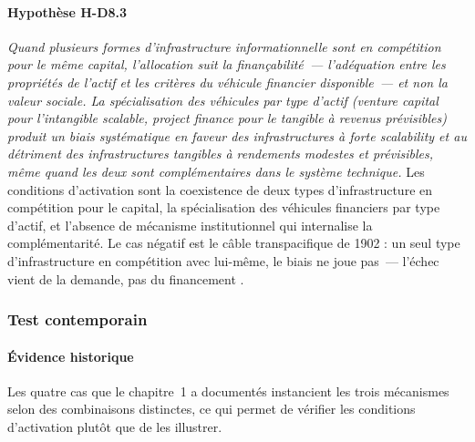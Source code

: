 \paragraph{Hypothèse H-D8.3} \emph{Quand plusieurs formes d'infrastructure informationnelle sont en compétition pour le même capital, l'allocation suit la \emph{finançabilité}~--- l'adéquation entre les propriétés de l'actif et les critères du véhicule financier disponible~--- et non la valeur sociale. La spécialisation des véhicules par type d'actif (\emph{venture capital} pour l'intangible scalable, \emph{project finance} pour le tangible à revenus prévisibles) produit un biais systématique en faveur des infrastructures à forte \emph{scalability} et au détriment des infrastructures tangibles à rendements modestes et prévisibles, même quand les deux sont complémentaires dans le système technique.} Les conditions d'activation sont la coexistence de deux types d'infrastructure en compétition pour le capital, la spécialisation des véhicules financiers par type d'actif, et l'absence de mécanisme institutionnel qui internalise la complémentarité. Le cas négatif est le câble transpacifique de 1902 : un seul type d'infrastructure en compétition avec lui-même, le biais ne joue pas~--- l'échec vient de la demande, pas du financement \parencite{muller_telegraph_2015}.


\subsubsection{Test contemporain}

\paragraph{Évidence historique}

Les quatre cas que le chapitre~1 a documentés instancient les trois mécanismes selon des combinaisons distinctes, ce qui permet de vérifier les conditions d'activation plutôt que de les illustrer.


